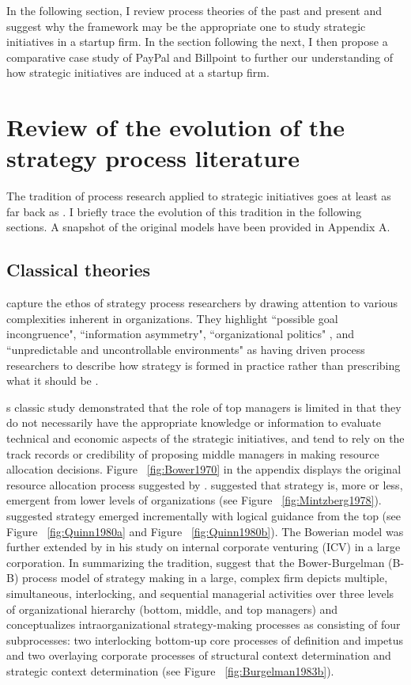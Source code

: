 \documentclass[12pt,letterpaper]{article}
\begin{document}
In the following section, I review process theories of the past and present and suggest why the \cite{Lovas2000} framework may be the appropriate one to study strategic initiatives in a startup firm. In the section following the next, I then propose a comparative case study of PayPal and Billpoint to further our understanding of how strategic initiatives are induced at a startup firm. 

\section{Review of the evolution of the strategy process literature}
The tradition of process research applied to strategic initiatives goes at least as far back as \cite{Bower1970}. I briefly trace the evolution of this tradition in the following sections. A snapshot of the original models have been provided in Appendix A.

\subsection{Classical theories}
\cite{Noda1996} capture the ethos of strategy process researchers by drawing attention to various complexities inherent in organizations. They highlight ``possible goal incongruence", ``information asymmetry", ``organizational politics" \citep{Barnard1938, Simon1997, Cyert1963}, and ``unpredictable and uncontrollable environments" \citep{Schumpeter1934, Nelson1982, Thompson1967, Pfeffer1978} as having driven process researchers to describe how strategy is formed in practice rather than prescribing what it should be \citep{Mintzberg2005}.\par
\cite{Bower1970}\textquotesingle s classic study demonstrated that the role of top managers is limited in that they do not necessarily have the appropriate knowledge or information to evaluate technical and economic aspects of the strategic initiatives, and tend to rely on the track records or credibility of proposing middle managers in making resource allocation decisions. Figure ~\ref{fig:Bower1970} in the appendix displays the original resource allocation process suggested by \cite{Bower1970}. \cite{Mintzberg1978} suggested that strategy is, more or less, emergent from lower levels of organizations  (see Figure ~\ref{fig:Mintzberg1978}). \cite{Quinn1980} suggested strategy emerged incrementally with logical guidance from the top  (see Figure ~\ref{fig:Quinn1980a} and Figure ~\ref{fig:Quinn1980b}). The Bowerian model was further extended by \cite{Burgelman1983b} in his study on internal corporate venturing (ICV) in a large corporation. In summarizing the tradition, \cite{Noda1996} suggest that the Bower-Burgelman (B-B) process model of strategy making in a large, complex firm depicts multiple, simultaneous, interlocking, and sequential managerial activities over three levels of organizational hierarchy (bottom, middle, and top managers) and conceptualizes intraorganizational strategy-making processes as consisting of four subprocesses: two interlocking bottom-up core processes of definition and impetus and two overlaying corporate processes of structural context determination and strategic context determination (see Figure  ~\ref{fig:Burgelman1983b}).
\end{document}
